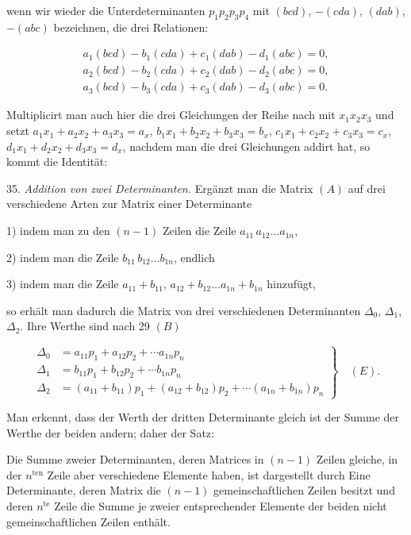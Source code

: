 wenn wir wieder die Unterdeterminanten $p_1p_2p_3p_4$ mit $(bcd)$,
$-(cda)$, $(dab)$, $-(abc)$ bezeichnen, die drei Relationen:

\[
\begin{gathered}
a_1(bcd)-b_1(cda)+c_1(dab)-d_1(abc)=0,\\
a_2(bcd)-b_2(cda)+c_2(dab)-d_2(abc)=0,\\
a_3(bcd)-b_3(cda)+c_3(dab)-d_3(abc)=0.
\end{gathered}
\]

Multiplicirt man auch hier die drei Gleichungen der Reihe nach mit
$x_1x_2x_3$ und setzt $a_1x_1+a_2x_2+a_3x_3=a_x$,
$b_1x_1+b_2x_2+b_3x_3=b_x$, $c_1x_1+c_2x_2+c_3x_3=c_x$,
$d_1x_1+d_2x_2+d_3x_3=d_x$, nachdem man die drei Gleichungen addirt hat,
so kommt die Identität:



35. \textit{Addition von zwei Determinanten.} Ergänzt man die Matrix
$(A)$ auf drei verschiedene Arten zur Matrix einer Determinante

1) indem man zu den $(n-1)$ Zeilen die Zeile $a_{11}\,a_{12}\ldots
a_{1n}$,

2) indem man die Zeile $b_{11}\,b_{12}\ldots b_{1n}$, endlich

3) indem man die Zeile $a_{11}+b_{11},\,a_{12}+b_{12}\ldots
a_{1n}+b_{1n}$ hinzufügt,

so erhält man dadurch die Matrix von drei verschiedenen Determinanten
$\Delta_0$, $\Delta_1$, $\Delta_2$. Ihre Werthe sind nach 29 $(B)$

\[
\left.
\begin{aligned}
\Delta_0 &= a_{11}p_1+a_{12}p_2+\cdots a_{1n}p_n\\
\Delta_1 &= b_{11}p_1+b_{12}p_2+\cdots b_{1n}p_n\\
\Delta_2 &= (a_{11}+b_{11})p_1+(a_{12}+b_{12})p_2+\cdots (a_{1n}+b_{1n})p_n
\end{aligned}
\right\}
\quad (E).
\]

Man erkennt, dass der Werth der dritten Determinante gleich ist der
Summe der Werthe der beiden andern; daher der Satz:

\glqq Die Summe zweier Determinanten, deren Matrices in $(n-1)$ Zeilen
gleiche, in der $n^{\text{ten}}$ Zeile aber verschiedene Elemente haben,
ist dargestellt durch Eine Determinante, deren Matrix die $(n-1)$
gemeinschaftlichen Zeilen besitzt und deren $n^{\text{te}}$ Zeile die
Summe je zweier entsprechender Elemente der beiden nicht
gemeinschaftlichen Zeilen enthält.\grqq{}

